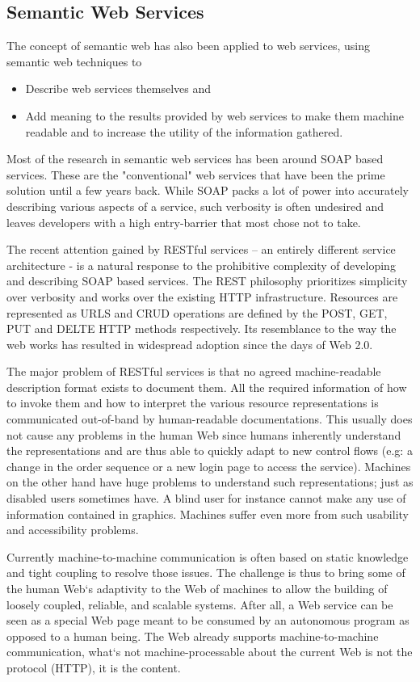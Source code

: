 \begin{spacing}{1.5}
\section{Semantic Web Services} 
The concept of semantic web has also been applied to web services, using semantic web techniques to 
\begin{itemize}
\item Describe web services themselves and
\item Add meaning to the results provided by web services to make them machine 
readable and to increase the utility of the information gathered. 
\end{itemize}

Most of the research in semantic web services has been around SOAP based services. These are the "conventional" web services that have been the prime solution until a few years back. While SOAP packs a lot of power into accurately describing various aspects of a service, such verbosity is often undesired and leaves developers with a high entry-barrier that most chose not to take. 

The recent attention gained by RESTful services\cite{9} – an entirely different service architecture - is a natural response to the prohibitive complexity of developing and describing SOAP based services. The REST philosophy prioritizes simplicity over verbosity and works over the existing HTTP infrastructure. Resources are represented as URLS and CRUD operations are defined by the POST, GET, PUT and DELTE HTTP methods respectively. Its resemblance to the way the web works has resulted in widespread adoption since the days of Web 2.0.

The major problem of RESTful services is that no agreed machine-readable description format exists to document them. All the required information of how to invoke them and how to interpret the various resource representations is communicated out-of-band by human-readable documentations. This usually does not cause any problems in the human Web since humans inherently understand the representations and are thus able to quickly adapt to new control flows (e.g: a change in the order sequence or a new login page to access the service). Machines on the other hand have huge problems to understand such representations; just as disabled users sometimes have. A blind user for instance cannot make any use of information contained in graphics. Machines suffer even more from such usability and accessibility problems. 

Currently machine-to-machine communication is often based on static knowledge and tight coupling to resolve those issues. The challenge is thus to bring some of the human Web‘s adaptivity to the Web of machines to allow the building of loosely coupled, reliable, and scalable systems. After all, a Web service can be seen as a special Web page meant to be consumed by an autonomous program as opposed to a human being. The Web already supports machine-to-machine communication, what‘s not machine-processable about the current Web is not the protocol (HTTP), it is the content. 


\end{spacing}
